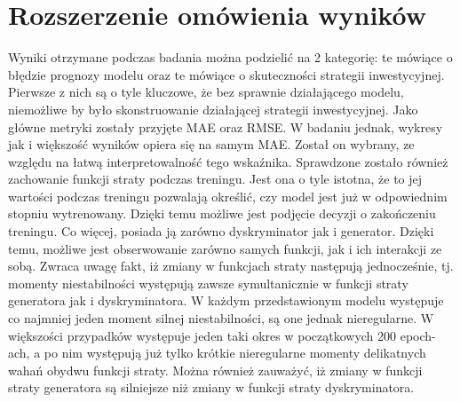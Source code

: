 \documentclass[review]{elsarticle} %
\begin{document}
\section{Rozszerzenie omówienia wyników}
Wyniki otrzymane podczas badania można podzielić na 2 kategorię: te mówiące o błędzie prognozy modelu oraz te mówiące o skuteczności strategii inwestycyjnej. Pierwsze z nich są o tyle kluczowe, że bez sprawnie działającego modelu, niemożliwe by było skonstruowanie działającej strategii inwestycyjnej. Jako główne metryki zostały przyjęte MAE oraz RMSE.  W badaniu jednak, wykresy jak i większość wyników opiera się na samym MAE. Został on wybrany, ze względu na łatwą interpretowalność tego wskaźnika. Sprawdzone zostało również zachowanie funkcji straty podczas treningu. Jest ona o tyle istotna, że to jej wartości podczas treningu pozwalają określić, czy model jest już w odpowiednim stopniu wytrenowany. Dzięki temu możliwe jest podjęcie decyzji o zakończeniu treningu. Co więcej, posiada ją zarówno dyskryminator jak i generator.  Dzięki temu, możliwe jest obserwowanie zarówno samych funkcji, jak i ich interakcji ze sobą. Zwraca uwagę fakt, iż zmiany w funkcjach straty następują jednocześnie, tj. momenty niestabilności występują zawsze symultanicznie w funkcji straty generatora jak i dyskryminatora. W każdym przedstawionym modelu występuje co najmniej jeden moment silnej niestabilności, są one jednak nieregularne. W większości przypadków występuje jeden taki okres w początkowych 200 epoch-ach, a po nim występują już tylko krótkie nieregularne momenty delikatnych wahań obydwu funkcji straty. Można również zauważyć, iż zmiany w funkcji straty generatora są silniejsze niż zmiany w funkcji straty dyskryminatora. 
\end{document}
